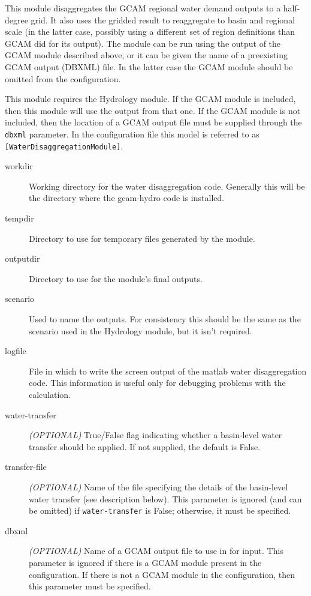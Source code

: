 \documentclass[11pt]{article}
\begin{document}
This module disaggregates the GCAM regional water demand outputs to a
half-degree grid.  It also uses the gridded result to reaggregate to
basin and regional scale (in the latter case, possibly using a
different set of region definitions than GCAM did for its output).
The module can be run using the output of the GCAM module described
above, or it can be given the name of a preexisting GCAM output
(DBXML) file.  In the latter case the GCAM module should be omitted
from the configuration.

This module requires the Hydrology module.  If the GCAM module is
included, then this module will use the output from that one.  If the
GCAM module is not included, then the location of a GCAM output file
must be supplied through the \texttt{dbxml} parameter.  In the
configuration file this model is referred to as
\texttt{[WaterDisaggregationModule]}.

\begin{description}
\item[workdir] Working directory for the water disaggregation code.
  Generally this will be the directory where the gcam-hydro code is
  installed.
\item[tempdir] Directory to use for temporary files generated by the
  module.
\item[outputdir] Directory to use for the module's final outputs.
\item[scenario] Used to name the outputs.  For consistency this should
  be the same as the scenario used in the Hydrology module, but it
  isn't required.
\item[logfile] File in which to write the screen output of the matlab
  water disaggregation code.  This information is useful only for
  debugging problems with the calculation.
\item[water-transfer] \emph{(OPTIONAL)} True/False flag indicating
  whether a basin-level water transfer should be applied.  If not
  supplied, the default is False.
\item[transfer-file] \emph{(OPTIONAL)} Name of the file specifying the
  details of the basin-level water transfer (see description below).
  This parameter is ignored (and can be omitted) if
  \texttt{water-transfer} is False; otherwise, it must be specified.
\item[dbxml] \emph{(OPTIONAL)} Name of a GCAM output file to use in
  for input.  This parameter is ignored if there is a GCAM module
  present in the configuration.  If there is not a GCAM module in the
  configuration, then this parameter must be specified.
\end{description}
\end{document}
